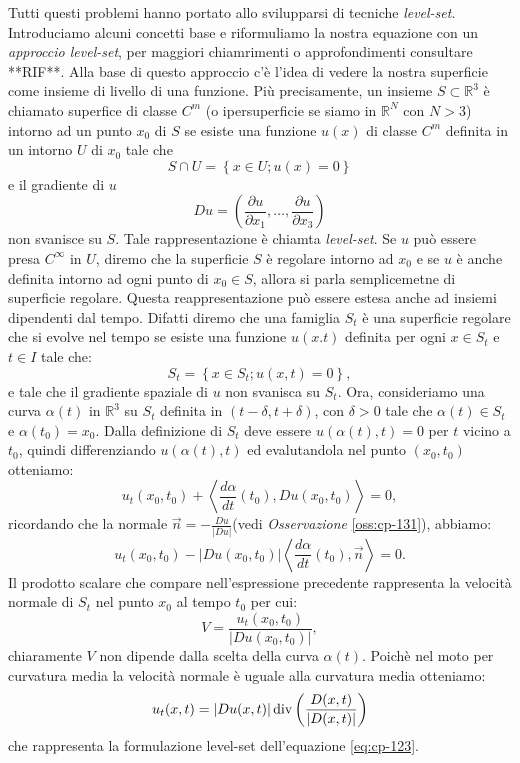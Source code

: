 Tutti questi problemi hanno portato allo svilupparsi di tecniche \emph{level-set}. Introduciamo alcuni concetti base e riformuliamo la nostra equazione con un \emph{approccio level-set}, per maggiori chiamrimenti o approfondimenti consultare **RIF**.
Alla base di questo approccio c'è l'idea di vedere la nostra superficie come  insieme di livello di una funzione. Più precisamente,
un insieme $S\subset\mathbb{R}^3$ è chiamato superfice di classe $C^m$ (o ipersuperficie se siamo in $\mathbb{R}^N$ con $N>3$) intorno ad un punto $x_0$ di $S$ se esiste una funzione $u(x)$ di classe $C^m$ definita in un intorno $U$ di $x_0$ tale che
\[
S\cap U=\left\{x\in U; u(x)=0\right\}
\]
e il gradiente di $u$
\[
 Du=\left(\frac{\partial u}{\partial x_1},\dots,\frac{\partial u}{\partial x_3}\right)
\]
non svanisce su $S$. Tale rappresentazione è chiamta \emph{level-set}. Se $u$ può essere presa $C^{\infty}$ in $U$, diremo che la superficie $S$ è regolare intorno ad $x_0$ e se $u$ è anche definita intorno ad ogni punto di $x_0\in S$, allora si parla semplicemetne di superficie regolare. Questa reappresentazione può essere estesa anche ad insiemi dipendenti dal tempo. Difatti diremo che una famiglia $S_t$ è una superficie regolare che si evolve nel tempo se esiste una funzione $u(x.t)$ definita per ogni $x\in S_t$ e $t\in I$ tale che:
\[
S_t=\left\{x\in S_t; u(x,t)=0\right\},
\]
e tale che il gradiente spaziale di $u$ non svanisca su $S_t$. Ora, consideriamo una curva $\alpha(t)$ in $\mathbb{R}^3$ su $S_t$ definita in $(t-\delta,t+\delta)$, con $\delta>0$ tale che $\alpha(t)\in S_t$ e $\alpha(t_0)=x_0$. Dalla definizione di $S_t$ deve essere $u(\alpha(t),t)=0$ per $t$ vicino a $t_0$, quindi differenziando  $u(\alpha(t),t)$ ed evalutandola nel punto $(x_0,t_0)$ otteniamo:
\[
u_t(x_0,t_0)+\left<\frac{d\alpha}{dt}(t_0),Du(x_0,t_0)\right>=0,
\]
ricordando che la normale $\vec{n}=-\frac{Du}{|Du|}$(vedi \emph{Osservazione} \ref{oss:cp-131}), abbiamo:
\[
u_t(x_0,t_0)-|Du(x_0,t_0)|\left<\frac{d\alpha}{dt}(t_0),\vec{n}\right>=0.
\]
Il prodotto scalare che compare nell'espressione precedente rappresenta la velocità normale di $S_t$ nel punto $x_0$ al tempo $t_0$ per cui: 
\[
V=\frac{u_t(x_0,t_0)}{|Du(x_0,t_0)|},
\]
chiaramente  $V$ non dipende dalla scelta della curva $\alpha(t)$. Poichè nel moto per curvatura media la velocità normale è uguale alla curvatura media otteniamo:
\begin{equation}
  \label{eq:cp-131}
  u_t(x,t)=|Du(x,t)|\operatorname{div}{\left(\frac{D(x,t)}{|D(x,t)|}\right)}
\end{equation}
che rappresenta la formulazione level-set dell'equazione \eqref{eq:cp-123}. 
